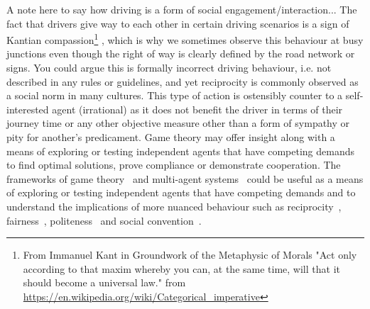\documentclass[sigconf]{acmart}
\begin{document}
%
%
A note here to say how driving is a form of social engagement/interaction...
%
The fact that drivers give way to each other in certain driving scenarios is a sign of Kantian compassion\footnote{From Immanuel Kant in Groundwork of the Metaphysic of Morals "Act only according to that maxim whereby you can, at the same time, will that it should become a universal law." from \url{https://en.wikipedia.org/wiki/Categorical_imperative}} 
, which is why we sometimes observe this behaviour at busy junctions even though the right of way is clearly defined by the road network or signs.
%
You could argue this is formally incorrect driving behaviour, i.e. not described in any rules or guidelines, and yet reciprocity is commonly observed as a social norm in many cultures. This type of action is ostensibly counter to a self-interested agent (irrational) as it does not benefit the driver in terms of their journey time or any other objective measure other than a form of sympathy or pity for another's predicament. 
%
%
%
%
Game theory may offer insight along with a means of exploring or testing independent agents that have competing demands to find optimal solutions, prove compliance or demonstrate cooperation. 
%
% 
The frameworks of game theory~\cite{myerson2013game} and multi-agent systems~\cite{ferber1999multi} could be useful as a means of exploring or testing independent agents that have competing demands and to understand the implications of more nuanced behaviour such as reciprocity~\cite{schecter2016game}, fairness~\cite{gintis2006foundations}, politeness~\cite{godoy2020c} and social convention~\cite{riaz2018collision,gupta2019scaling}. 
\end{document}
